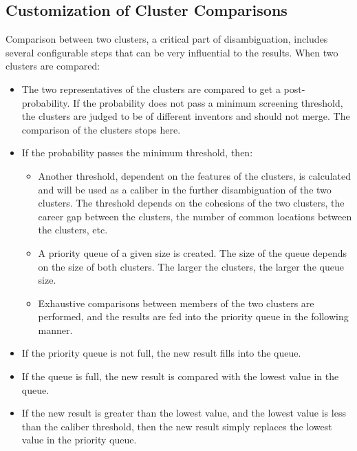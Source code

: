 \documentclass{article}
\begin{document}
\subsection{Customization of Cluster Comparisons}

Comparison between two clusters, a critical part of 
disambiguation, includes several configurable
steps that can be very influential to the results.
When two clusters are compared:

\begin{itemize}

\item  The two representatives of the clusters are compared 
to get a post-probability. If the probability does not pass 
a minimum screening threshold, the clusters are judged to be of
different inventors and should not merge. The comparison of 
the clusters stops here.

\item If the probability passes the minimum threshold, then:

\begin{itemize}

\item Another threshold, dependent on the features of the 
clusters, is calculated and will be used as a caliber in the 
further disambiguation of the two clusters. The threshold
depends on the cohesions of the two clusters, the career 
gap between the clusters, the number of common locations 
between the clusters, etc.

\item A priority queue of a given size is created. The size 
of the queue depends on the size of both clusters. The larger
the clusters, the larger the queue size.

\item Exhaustive comparisons between members of the two 
clusters are performed, and the results are fed into the
priority queue in the following manner.

\end{itemize}

\item If the priority queue is not full, the new result fills into the queue.

\item If the queue is full, the new result is compared with the lowest value in the
queue.

\item If the new result is greater than the lowest value, and the lowest
value is less than the caliber threshold, then the new result simply
replaces the lowest value in the priority queue.


\end{itemize}
\end{document}
